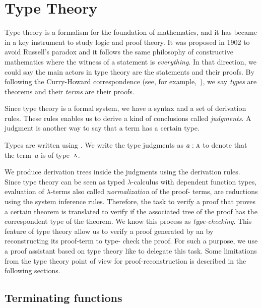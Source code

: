 \documentclass[../main.tex]{subfiles}
\begin{document}
\section{Type Theory}
\label{sec:type-theory}

Type theory is a formalism for the foundation of mathematics, and it has became in a key instrument to study logic and proof theory.
It was proposed in 1902 to avoid Russell's paradox and it follows
the same philosophy of constructive mathematics where the witness of
a statement is \emph{everything}. In that direction, we could say
the main actors in type theory are the statements and their proofs.
By following the Curry-Howard correspondence (see, for example,~\cite{Wadler-2015}), we say
\emph{types} are theorems and their \emph{terms} are their proofs.

Since type theory is a formal system, we have a syntax and a set of
derivation rules. These rules enables us to derive a kind of conclusions called
\emph{judgments}. A judgment is another way to say that a term has a certain type.

\begin{notation}
  Types are written using .  We write the type
  judgments as $a : \textsc{a}$ to denote that the term~$a$ is of
  type~$\textsc{a}$.
\end{notation}

We produce derivation trees inside the judgments using the derivation rules.
Since type theory can be seen as typed $λ$-calculus with dependent function
types, evaluation of $λ$-terms also called \emph{normalization} of the proof-
terms, are reductions using the system inference rules. Therefore, the task to
verify a proof that proves a certain theorem is translated to verify if the
associated tree of the proof has the correspondent type of the theorem. We know
this process as \emph{type-checking}. This feature of type theory allow us to
verify a proof generated by an \ATP by reconstructing its proof-term to type-
check the proof. For such a purpose, we use a proof assistant based on type
theory like \Agda to delegate this task.
Some limitations from the type theory
point of view for proof-reconstruction is described in the following sections.


\subsection{Terminating functions}
\label{ssec:structural-recursion}
\end{document}
